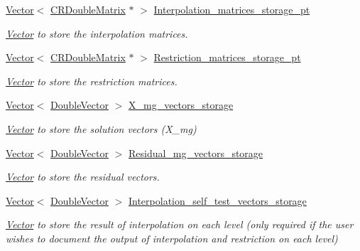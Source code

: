 \begin{DoxyCompactItemize}
\hyperlink{classoomph_1_1Vector}{Vector}$<$ \hyperlink{classoomph_1_1CRDoubleMatrix}{C\+R\+Double\+Matrix} $\ast$ $>$ \hyperlink{classoomph_1_1MGSolver_abb0744bdd778ed6076ee60803b0bc24a}{Interpolation\+\_\+matrices\+\_\+storage\+\_\+pt}
\begin{DoxyCompactList}\small\item\em \hyperlink{classoomph_1_1Vector}{Vector} to store the interpolation matrices. \end{DoxyCompactList}\item 
\hyperlink{classoomph_1_1Vector}{Vector}$<$ \hyperlink{classoomph_1_1CRDoubleMatrix}{C\+R\+Double\+Matrix} $\ast$ $>$ \hyperlink{classoomph_1_1MGSolver_a8a4974aac58e9835089da9b4b8039952}{Restriction\+\_\+matrices\+\_\+storage\+\_\+pt}
\begin{DoxyCompactList}\small\item\em \hyperlink{classoomph_1_1Vector}{Vector} to store the restriction matrices. \end{DoxyCompactList}\item 
\hyperlink{classoomph_1_1Vector}{Vector}$<$ \hyperlink{classoomph_1_1DoubleVector}{Double\+Vector} $>$ \hyperlink{classoomph_1_1MGSolver_ad0117f918473d50a9ca8526103401534}{X\+\_\+mg\+\_\+vectors\+\_\+storage}
\begin{DoxyCompactList}\small\item\em \hyperlink{classoomph_1_1Vector}{Vector} to store the solution vectors (X\+\_\+mg) \end{DoxyCompactList}\item 
\hyperlink{classoomph_1_1Vector}{Vector}$<$ \hyperlink{classoomph_1_1DoubleVector}{Double\+Vector} $>$ \hyperlink{classoomph_1_1MGSolver_a2c3f9d64997faf275de633fe3c799fee}{Residual\+\_\+mg\+\_\+vectors\+\_\+storage}
\begin{DoxyCompactList}\small\item\em \hyperlink{classoomph_1_1Vector}{Vector} to store the residual vectors. \end{DoxyCompactList}\item 
\hyperlink{classoomph_1_1Vector}{Vector}$<$ \hyperlink{classoomph_1_1DoubleVector}{Double\+Vector} $>$ \hyperlink{classoomph_1_1MGSolver_ab751da487614e6f661b8d944f37c20ec}{Interpolation\+\_\+self\+\_\+test\+\_\+vectors\+\_\+storage}
\begin{DoxyCompactList}\small\item\em \hyperlink{classoomph_1_1Vector}{Vector} to store the result of interpolation on each level (only required if the user wishes to document the output of interpolation and restriction on each level) \end{DoxyCompactList}\item 

\end{DoxyCompactItemize}
